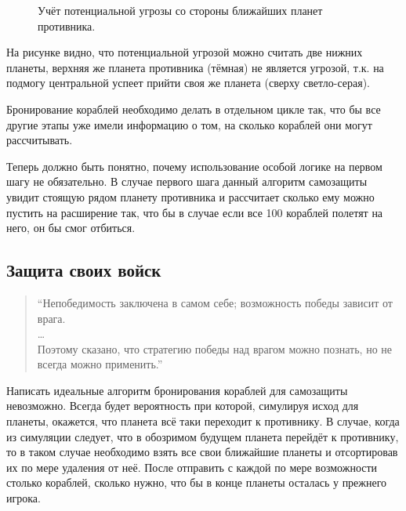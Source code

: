\documentclass[12pt]{report}
\begin{document}
\begin{figure}[h]
	\centering
	
	\caption{Учёт потенциальной угрозы со стороны ближайших планет противника.	 }
	\label{fig:closetsEnemies}
\end{figure}

На рисунке видно, что потенциальной угрозой можно считать две нижних планеты, верхняя же планета противника (тёмная) не является угрозой, т.к. на подмогу центральной успеет прийти своя же планета (сверху светло-серая).

Бронирование кораблей необходимо делать в отдельном цикле так, что бы все другие этапы уже имели информацию о том, на сколько кораблей они могут рассчитывать.

Теперь должно быть понятно, почему использование особой логике на первом шагу не обязательно. В случае первого шага данный алгоритм самозащиты увидит стоящую рядом планету противника и рассчитает сколько ему можно пустить на расширение так, что бы в случае если все 100 кораблей полетят на него, он бы смог отбиться. 

\subsection{Защита своих войск}
\begin{quote}
``Непобедимость заключена в самом себе; возможность победы зависит от врага.\\
\ldots\\
Поэтому сказано, что стратегию победы над врагом можно познать, но не всегда можно применить.''\\
\citep{tzu1971art}
\end{quote}

Написать идеальные алгоритм бронирования кораблей для самозащиты невозможно. Всегда будет вероятность при которой, симулируя исход для планеты, окажется, что планета всё таки переходит к противнику. В случае, когда из симуляции следует, что в обозримом будущем планета перейдёт к противнику, то в таком случае необходимо взять все свои ближайшие планеты и отсортировав их по мере удаления от неё. После отправить с каждой по мере возможности столько кораблей, сколько нужно, что бы в конце планеты осталась у прежнего игрока.

\end{document}
